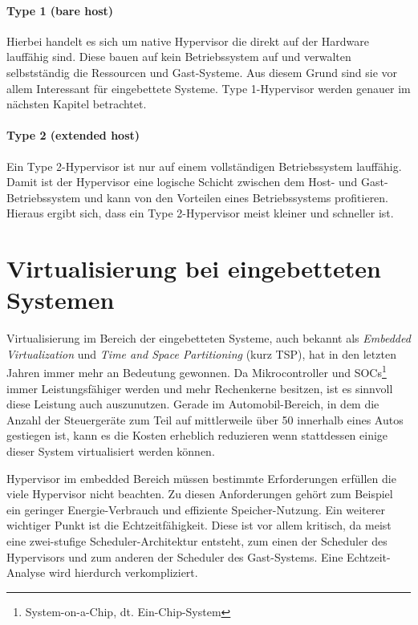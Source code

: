 \documentclass[
  a4paper,					    %
  twoside,
  DIV=calc,     				%
  bibliography=totoc,
  cleardoublepage=empty,
  ngerman,     					%
  final       					%
]{scrbook}
\begin{document}
\paragraph{Type 1 (bare host)} Hierbei handelt es sich um native Hypervisor die direkt auf der Hardware lauffähig sind. Diese bauen auf kein Betriebssystem auf und verwalten selbstständig die Ressourcen und Gast-Systeme. Aus diesem Grund sind sie vor allem Interessant für eingebettete Systeme. Type 1-Hypervisor werden genauer im nächsten Kapitel betrachtet.

\paragraph{Type 2 (extended host)} Ein Type 2-Hypervisor ist nur auf einem vollständigen Betriebssystem lauffähig. Damit ist der Hypervisor eine logische Schicht zwischen dem Host- und Gast-Betriebssystem und kann von den Vorteilen eines Betriebssystems profitieren. Hieraus ergibt sich, dass ein Type 2-Hypervisor meist kleiner und schneller ist.





\section{Virtualisierung bei eingebetteten Systemen}
\label{sec:EVirtualisierung}
Virtualisierung im Bereich der eingebetteten Systeme, auch bekannt als \emph{Embedded Virtualization} und \emph{Time and Space Partitioning} (kurz TSP), hat in den letzten Jahren immer mehr an Bedeutung gewonnen. Da Mikrocontroller und SOCs\footnote{System-on-a-Chip, dt. Ein-Chip-System} immer Leistungsfähiger werden und mehr Rechenkerne besitzen, ist es sinnvoll diese Leistung auch auszunutzen. Gerade im Automobil-Bereich, in dem die Anzahl der Steuergeräte zum Teil auf mittlerweile über 50 innerhalb eines Autos gestiegen ist, kann es die Kosten erheblich reduzieren wenn stattdessen einige dieser System virtualisiert werden können.

Hypervisor im embedded Bereich müssen bestimmte Erforderungen erfüllen die viele Hypervisor nicht beachten. Zu diesen Anforderungen gehört zum Beispiel ein geringer Energie-Verbrauch und effiziente Speicher-Nutzung. Ein weiterer wichtiger Punkt ist die Echtzeitfähigkeit. Diese ist vor allem kritisch, da meist eine zwei-stufige Scheduler-Architektur entsteht, zum einen der Scheduler des Hypervisors und zum anderen der Scheduler des Gast-Systems. Eine Echtzeit-Analyse wird hierdurch verkompliziert.\cite{two_lvl_sched}
\end{document}
